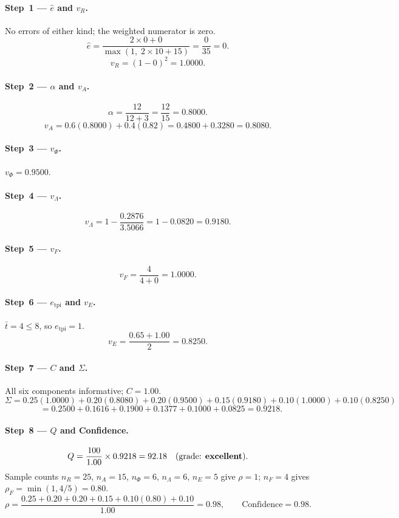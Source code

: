 \documentclass[11pt,a4paper]{article}
\begin{document}
\paragraph{Step~1 --- $\hat{e}$ and $v_R$.}
No errors of either kind; the weighted numerator is zero.
\[
  \hat{e} = \frac{2\times0+0}{\max(1,\;2\times10+15)} = \frac{0}{35} = 0.
\]
\[
  v_R = (1-0)^2 = 1.0000.
\]

\paragraph{Step~2 --- $\alpha$ and $v_A$.}
\[
  \alpha = \frac{12}{12+3} = \frac{12}{15} = 0.8000.
\]
\[
  v_A = 0.6(0.8000)+0.4(0.82) = 0.4800+0.3280 = 0.8080.
\]

\paragraph{Step~3 --- $v_\Phi$.} $v_\Phi = 0.9500$.

\paragraph{Step~4 --- $v_\Lambda$.}
\[
  v_\Lambda = 1 - \frac{0.2876}{3.5066} = 1 - 0.0820 = 0.9180.
\]

\paragraph{Step~5 --- $v_F$.}
\[
  v_F = \frac{4}{4+0} = 1.0000.
\]

\paragraph{Step~6 --- $e_{\mathrm{tpi}}$ and $v_E$.}
$\bar{t}=4\leq8$, so $e_{\mathrm{tpi}}=1$.
\[
  v_E = \frac{0.65+1.00}{2} = 0.8250.
\]

\paragraph{Step~7 --- $C$ and $\Sigma$.}
All six components informative; $C=1.00$.
\[
  \Sigma = 0.25(1.0000)+0.20(0.8080)+0.20(0.9500)
         +0.15(0.9180)+0.10(1.0000)+0.10(0.8250)
\]
\[
  \phantom{\Sigma}= 0.2500+0.1616+0.1900+0.1377+0.1000+0.0825 = 0.9218.
\]

\paragraph{Step~8 --- $Q$ and Confidence.}
\[
  Q = \frac{100}{1.00}\times0.9218 = 92.18 \quad (\text{grade: \textbf{excellent}}).
\]
Sample counts $n_R=25$, $n_A=15$, $n_\Phi=6$, $n_\Lambda=6$, $n_E=5$
give $\rho=1$; $n_F=4$ gives $\rho_F=\min(1,4/5)=0.80$.
\[
  \rho = \frac{0.25+0.20+0.20+0.15+0.10(0.80)+0.10}{1.00} = 0.98,
  \qquad \text{Confidence} = 0.98.
\]
\end{document}
